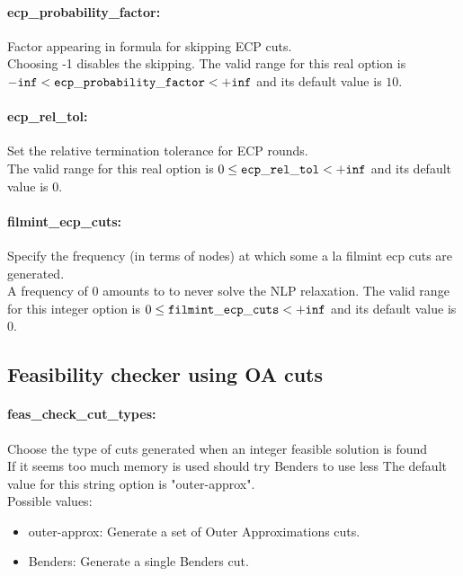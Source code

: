 \paragraph{ecp\_probability\_factor:}\label{opt:ecp_probability_factor} Factor appearing in formula for skipping ECP cuts. \\
 Choosing -1 disables the skipping. The valid range for this real option is 
${\tt -inf} <  {\tt ecp\_probability\_factor } <  {\tt +inf}$
and its default value is $10$.


\paragraph{ecp\_rel\_tol:}\label{opt:ecp_rel_tol} Set the relative termination tolerance for ECP rounds. \\
 The valid range for this real option is 
$0 \le {\tt ecp\_rel\_tol } <  {\tt +inf}$
and its default value is $0$.


\paragraph{filmint\_ecp\_cuts:}\label{opt:filmint_ecp_cuts} Specify the frequency (in terms of nodes) at which some a la filmint ecp cuts are generated. \\
 A frequency of 0 amounts to to never solve the NLP relaxation. The valid range for this integer option is
$0 \le {\tt filmint\_ecp\_cuts } <  {\tt +inf}$
and its default value is $0$.


\subsection{Feasibility checker using OA cuts}
\label{sec:FeasibilitycheckerusingOAcuts}
\paragraph{feas\_check\_cut\_types:}\label{opt:feas_check_cut_types} Choose the type of cuts generated when an integer feasible solution is found \\
 If it seems too much memory is used should try Benders to use less The default value for this string option is "outer-approx".
\\ 
Possible values:
\begin{itemize}
   \item outer-approx: Generate a set of Outer Approximations cuts.
   \item Benders: Generate a single Benders cut.
\end{itemize}

